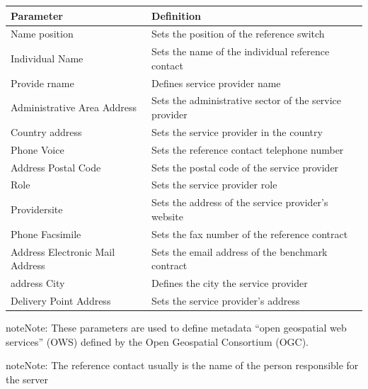 \documentclass[letterpaper,10pt,english]{sphinxmanual}
\begin{document}
\begin{tabulary}{\linewidth}{|L|L|}
\hline

\textbf{Parameter}
 & 
\textbf{Definition}
\\
\hline
Name position
 & 
Sets the position of the reference switch
\\
\hline
Individual Name
 & 
Sets the name of the individual reference contact
\\
\hline
Provide rname
 & 
Defines service provider name
\\
\hline
Administrative Area Address
 & 
Sets the administrative sector of the service provider
\\
\hline
Country address
 & 
Sets the service provider in the country
\\
\hline
Phone Voice
 & 
Sets the reference contact telephone number
\\
\hline
Address Postal Code
 & 
Sets the postal code of the service provider
\\
\hline
Role
 & 
Sets the service provider role
\\
\hline
Providersite
 & 
Sets the address of the service provider's website
\\
\hline
Phone Facsimile
 & 
Sets the fax number of the reference contract
\\
\hline
Address Electronic Mail Address
 & 
Sets the email address of the benchmark contract
\\
\hline
address City
 & 
Defines the city the service provider
\\
\hline
Delivery Point Address
 & 
Sets the service provider's address
\\
\hline\end{tabulary}


\begin{notice}{note}{Note:}
These parameters are used to define metadata ``open geospatial web services'' (OWS) defined by the Open Geospatial Consortium (OGC).
\end{notice}

\begin{notice}{note}{Note:}
The reference contact usually is the name of the person responsible for the server
\end{notice}
\end{document}
